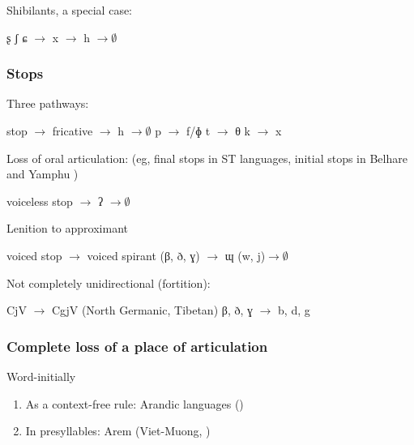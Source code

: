 \documentclass[oldfontcommands,oneside,a4paper,11pt]{article}
\begin{document}
Shibilants, a special case:

\begin{exe}
\ex
\glt ʂ ʃ ɕ $\rightarrow$  x $\rightarrow$ h $\rightarrow \emptyset$ 
\end{exe}


 \subsubsection{Stops}
 
 Three pathways:
 \begin{exe}
\ex
\glt stop $\rightarrow$  fricative $\rightarrow$ h $\rightarrow \emptyset$ 
\glt p $\rightarrow$  f/ɸ
\glt t $\rightarrow$  θ
\glt k $\rightarrow$  x
\end{exe}


Loss of oral articulation: (eg, final stops in ST languages, initial stops in Belhare and Yamphu \citet{michailovsky10kiranti})
 \begin{exe}
\ex
\glt voiceless stop $\rightarrow$  ʔ $\rightarrow \emptyset$ 
\end{exe}

Lenition to approximant

\begin{exe}
\ex
\glt voiced stop  $\rightarrow$ voiced spirant (β, ð, ɣ) $\rightarrow$ ɰ (w, j)$\rightarrow \emptyset$ 
\end{exe} 

Not completely unidirectional (fortition):

\begin{exe}
\ex
\glt CjV $\rightarrow$ CgjV (North Germanic, Tibetan)
\glt β, ð, ɣ $\rightarrow$ b, d, g
\end{exe} 

  
 \subsubsection{Complete loss of a place of articulation}

Word-initially 
  \begin{enumerate}
  \item  As a context-free rule: Arandic languages (\citealt{koch04arandic})
\item In presyllables: Arem (Viet-Muong, \citealt{ferlus96monosyllabisme})
\end{enumerate}
\end{document}
